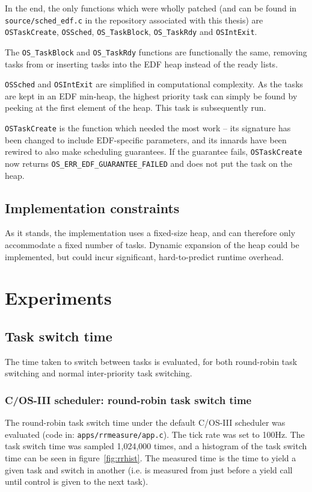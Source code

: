 \documentclass[twoside]{uva-inf-bachelor-thesis}
\newcommand{\code}[1]{\lstinline[breaklines=true]{#1}}
\newcommand{\ucosiii}{\textmu C/OS-III\xspace}
\begin{document}
In the end, the only functions which were wholly patched (and can be found in \code{source/sched_edf.c} in the repository associated with this thesis) are \code{OSTaskCreate}, \code{OSSched}, \code{OS_TaskBlock}, \code{OS_TaskRdy} and \code{OSIntExit}.

The \code{OS_TaskBlock} and \code{OS_TaskRdy} functions are functionally the same, removing tasks from or inserting tasks into the EDF heap instead of the ready lists.

\code{OSSched} and \code{OSIntExit} are simplified in computational complexity. As the tasks are kept in an EDF min-heap, the highest priority task can simply be found by peeking at the first element of the heap. This task is subsequently run.

\code{OSTaskCreate} is the function which needed the most work -- its signature has been changed to include EDF-specific parameters, and its innards have been rewired to also make scheduling guarantees. If the guarantee fails, \code{OSTaskCreate} now returns \code{OS_ERR_EDF_GUARANTEE_FAILED} and does not put the task on the heap.

\section{Implementation constraints}
As it stands, the implementation uses a fixed-size heap, and can therefore only accommodate a fixed number of tasks. Dynamic expansion of the heap could be implemented, but could incur significant, hard-to-predict runtime overhead.

%
%
%
%

\chapter{Experiments}
\section{Task switch time}
The time taken to switch between tasks is evaluated, for both round-robin task switching and normal inter-priority task switching.

\subsection{\ucosiii scheduler: round-robin task switch time}
The round-robin task switch time under the default \ucosiii scheduler was evaluated (code in: \code{apps/rrmeasure/app.c}). The tick rate was set to 100Hz. The task switch time was sampled 1,024,000 times, and a histogram of the task switch time can be seen in figure~\ref{fig:rrhist}. The measured time is the time to yield a given task and switch in another (i.e. is measured from just before a yield call until control is given to the next task).
\end{document}

